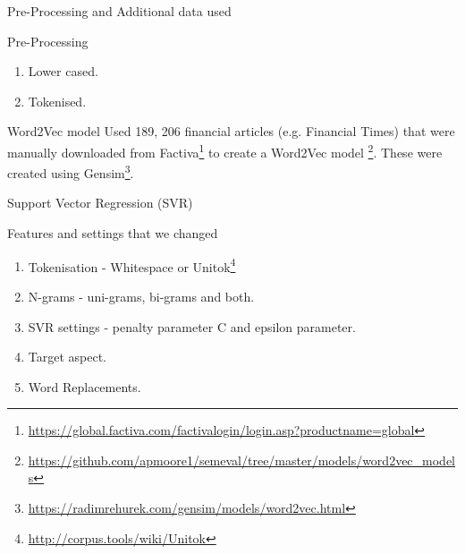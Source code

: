 \documentclass[10pt]{beamer}
\begin{document}
\begin{frame}[fragile]{Pre-Processing and Additional data used}
\begin{block}{Pre-Processing}
\begin{enumerate}
\item Lower cased.
\item Tokenised.
\end{enumerate}
\end{block}

\begin{block}{Word2Vec model}
Used 189, 206 financial articles (e.g. Financial Times) that were manually downloaded from Factiva\footnote{\url{https://global.factiva.com/factivalogin/login.asp?productname=global}} to create a Word2Vec model \cite{mikolov2013efficient}\footnote{\url{https://github.com/apmoore1/semeval/tree/master/models/word2vec_models}}.\newline\newline
These were created using Gensim\footnote{\url{https://radimrehurek.com/gensim/models/word2vec.html}}.
\end{block}

\end{frame}


\begin{frame}[fragile]{Support Vector Regression (SVR) \cite{drucker1997support}}
\begin{block}{Features and settings that we changed}
\begin{enumerate}
\item Tokenisation - Whitespace or Unitok\footnote{\url{http://corpus.tools/wiki/Unitok}}
\item N-grams - uni-grams, bi-grams and both.
\item SVR settings - penalty parameter C and epsilon parameter.
\item Target aspect. 
\item Word Replacements.
\end{enumerate}

\end{block}

\end{frame}
\end{document}
